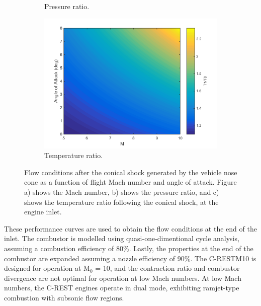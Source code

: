 \begin{figure}[ht]
\begin{subfigure}{.5\textwidth}
		\caption{Pressure ratio.}
		\label{fig:ConicalP}
	\end{subfigure}
	\begin{subfigure}{.5\textwidth}
		\centering
		\includegraphics[width=0.99\linewidth]{figures/3_vehicle_design/ConicalT}
		\caption{Temperature ratio.}
		\label{fig:ConicalT}
	\end{subfigure}
	\caption{Flow conditions after the conical shock generated by the vehicle nose cone as a function of flight Mach number and angle of attack. Figure a) shows the Mach number, b) shows the pressure ratio, and c) shows the temperature ratio following the conical shock, at the engine inlet.}
	\label{fig:ConicalShock}
\end{figure}
These performance curves are used to obtain the flow conditions at the end of the inlet. The combustor is modelled using quasi-one-dimentional cycle analysis, assuming a combustion efficiency of 80\%\cite{Jazra2010,Preller2018a}. Lastly, the properties at the end of the combustor are expanded assuming a nozzle efficiency of 90\%\cite{Preller2018a}.
The C-RESTM10 is designed for operation at M$_0$ = 10, and the contraction ratio and combustor divergence are not optimal for operation at low Mach numbers. At low Mach numbers, the C-REST engines operate in dual mode, exhibiting ramjet-type combustion with subsonic flow regions\cite{Preller2017b,Curran2016}. 



